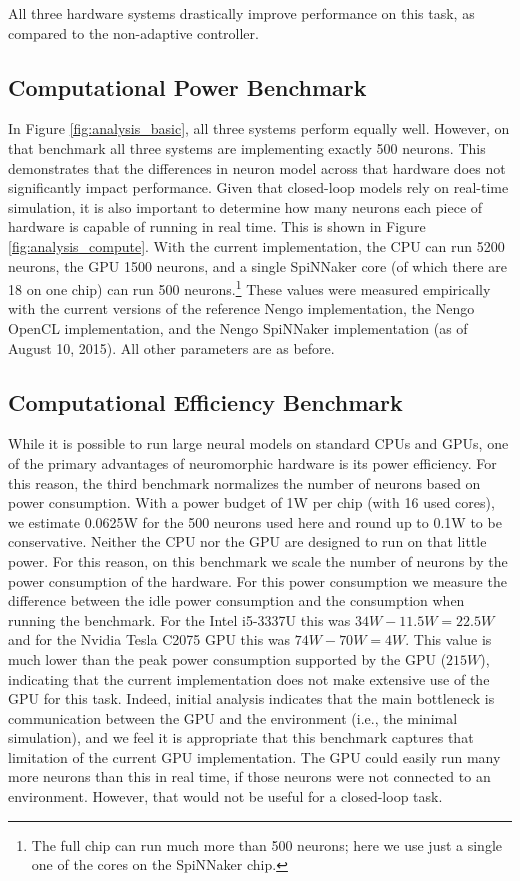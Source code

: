 \documentclass{frontiersSCNS} %
\begin{document}
All three hardware systems drastically improve performance on this task, as
compared to the non-adaptive controller.

\subsection{Computational Power Benchmark}

In Figure \ref{fig:analysis_basic}, all three systems perform equally well.
However, on that benchmark all three systems are implementing exactly 500
neurons.  This demonstrates that the
differences in neuron model across that hardware does not significantly
impact performance.  Given that closed-loop models rely on real-time simulation,
it is also important to determine how many neurons each piece of hardware is capable of running in real time.
This is shown in Figure \ref{fig:analysis_compute}.  With the current implementation, the CPU can
run 5200 neurons, the GPU 1500 neurons, and a single SpiNNaker core (of which
there are 18 on one chip) can run 500
neurons.\footnote{The full chip can run much more than 500 neurons; here we use just a single one of the cores on the SpiNNaker chip.}  These values were measured empirically with the current versions
of the reference Nengo implementation, the Nengo OpenCL implementation,
and the Nengo SpiNNaker implementation (as of August 10, 2015).  All other
parameters are as before.

\subsection{Computational Efficiency Benchmark}

While it is possible to run large neural models on standard CPUs and GPUs,
one of the primary advantages of neuromorphic hardware is its power
efficiency.  For this reason, the third benchmark normalizes the number of neurons
based on power consumption.  With a power budget of 1W per chip (with 16 used cores),
we estimate 0.0625W for the 500 neurons used here and round up to 0.1W to be
conservative.  Neither the CPU nor the
GPU are designed to run on that little power.  For this reason,
on this benchmark we scale the number of neurons by the power consumption of the hardware.
For this power consumption we measure the difference between the idle power
consumption and the consumption when running the benchmark.  For the Intel
i5-3337U this was $34W - 11.5W = 22.5W$ and for the Nvidia Tesla C2075 GPU
this was $74W - 70W = 4W$.  This value is much lower than the peak power
consumption supported by the GPU ($215W$), indicating that the current implementation
does not make extensive use of the GPU for this task.  Indeed, initial analysis indicates that
the main bottleneck is communication between the GPU and the environment (i.e.,
the minimal simulation), and we feel it is appropriate that this benchmark
captures that limitation of the current GPU implementation.  The GPU could easily
run many more neurons than this in real time, if those neurons were not connected
to an environment.  However, that would not be useful for a closed-loop task.
\end{document}
